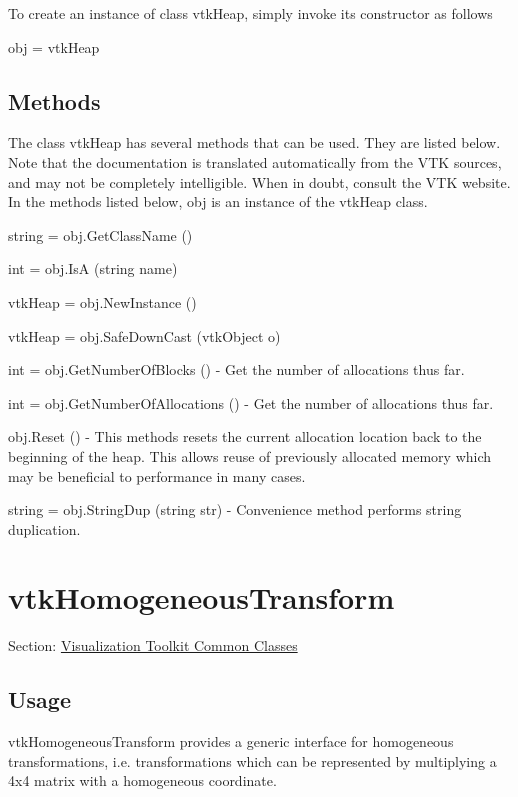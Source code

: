 To create an instance of class vtk\-Heap, simply invoke its constructor as follows \begin{DoxyVerb}  obj = vtkHeap
\end{DoxyVerb}
 \hypertarget{vtkwidgets_vtkxyplotwidget_Methods}{}\subsection{Methods}\label{vtkwidgets_vtkxyplotwidget_Methods}
The class vtk\-Heap has several methods that can be used. They are listed below. Note that the documentation is translated automatically from the V\-T\-K sources, and may not be completely intelligible. When in doubt, consult the V\-T\-K website. In the methods listed below, {\ttfamily obj} is an instance of the vtk\-Heap class. 
\begin{DoxyItemize}
\item {\ttfamily string = obj.\-Get\-Class\-Name ()}  
\item {\ttfamily int = obj.\-Is\-A (string name)}  
\item {\ttfamily vtk\-Heap = obj.\-New\-Instance ()}  
\item {\ttfamily vtk\-Heap = obj.\-Safe\-Down\-Cast (vtk\-Object o)}  
\item {\ttfamily int = obj.\-Get\-Number\-Of\-Blocks ()} -\/ Get the number of allocations thus far.  
\item {\ttfamily int = obj.\-Get\-Number\-Of\-Allocations ()} -\/ Get the number of allocations thus far.  
\item {\ttfamily obj.\-Reset ()} -\/ This methods resets the current allocation location back to the beginning of the heap. This allows reuse of previously allocated memory which may be beneficial to performance in many cases.  
\item {\ttfamily string = obj.\-String\-Dup (string str)} -\/ Convenience method performs string duplication.  
\end{DoxyItemize}\hypertarget{vtkcommon_vtkhomogeneoustransform}{}\section{vtk\-Homogeneous\-Transform}\label{vtkcommon_vtkhomogeneoustransform}
Section\-: \hyperlink{sec_vtkcommon}{Visualization Toolkit Common Classes} \hypertarget{vtkwidgets_vtkxyplotwidget_Usage}{}\subsection{Usage}\label{vtkwidgets_vtkxyplotwidget_Usage}
vtk\-Homogeneous\-Transform provides a generic interface for homogeneous transformations, i.\-e. transformations which can be represented by multiplying a 4x4 matrix with a homogeneous coordinate.

